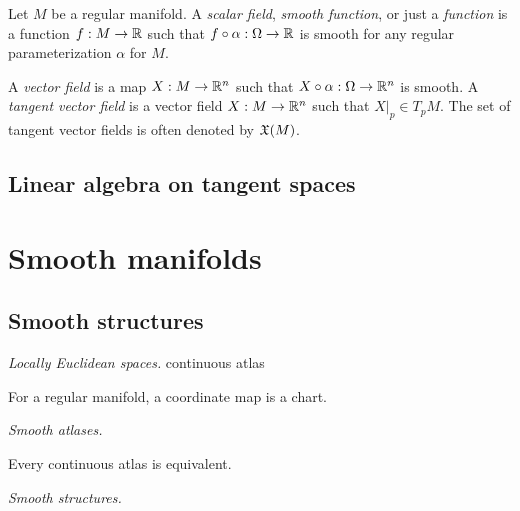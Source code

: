 \documentclass{../note}
\def\a{\alpha}
\begin{document}
\begin{prb}
Let $M$ be a regular manifold.
A \emph{scalar field}, \emph{smooth function}, or just a \emph{function} is a function $f:M\to\mathbb{R}$ such that $f\circ\a:\Omega\to\R$ is smooth for any regular parameterization $\a$ for $M$.
\begin{parts}
\item 
\end{parts}
\end{prb}

A \emph{vector field} is a map $X:M\to\mathbb{R}^n$ such that $X\circ\a:\Omega\to\R^n$ is smooth.
A \emph{tangent vector field} is a vector field $X:M\to\mathbb{R}^n$ such that $X|_p\in T_pM$.
The set of tangent vector fields is often denoted by $\mathfrak{X}(M)$.
\section{Linear algebra on tangent spaces}






\chapter{Smooth manifolds}
\section{Smooth structures}


\begin{prb}\emph{Locally Euclidean spaces.}
continuous atlas
\begin{parts}
\item For a regular manifold, a coordinate map is a chart.
\end{parts}
\end{prb}


\begin{prb}\emph{Smooth atlases.}
\begin{parts}
\item Every continuous atlas is equivalent.
\item 
\end{parts}
\end{prb}


\begin{prb}\emph{Smooth structures.}
\begin{parts}
\item 
\end{parts}
\end{prb}
\end{document}
